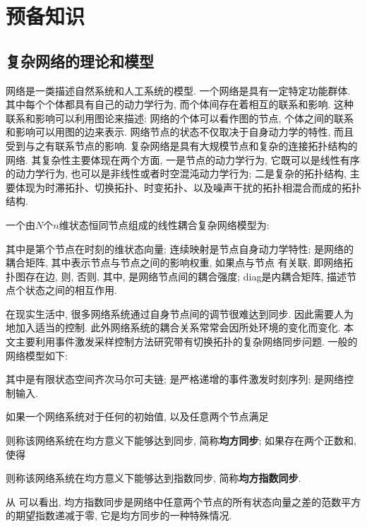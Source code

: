 \chapter{预备知识}\label{chap:math}
\section{复杂网络的理论和模型}
        网络是一类描述自然系统和人工系统的模型. 一个网络是具有一定特定功能群体. 其中每个个体都具有自己的动力学行为, 而个体间存在着相互的联系和影响. 这种联系和影响可以利用图论来描述: 网络的个体可以看作图的节点, 个体之间的联系和影响可以用图的边来表示. 网络节点的状态不仅取决于自身动力学的特性, 而且受到与之有联系节点的影响.
        复杂网络是具有大规模节点和复杂的连接拓扑结构的网络. 其复杂性主要体现在两个方面, 一是节点的动力学行为, 它既可以是线性有序的动力学行为, 也可以是非线性或者时空混沌动力学行为; 二是复杂的拓扑结构, 主要体现为时滞拓扑、切换拓扑、时变拓扑、以及噪声干扰的拓扑相混合而成的拓扑结构.

        一个由$N$个$n$维状态恒同节点组成的线性耦合复杂网络模型为:
        \begin{comment}
           \dot{x}_{i}(t)=f(t,x_{i}(t))-c\sum^N_{j=1}l_{ij}\Gamma[x_{j}(t)-x_{i}(t)], \quad i = 1,\cdots,N,
        \end{comment}
        其中是第个节点在时刻的维状态向量; 连续映射是节点自身动力学特性; 是网络的耦合矩阵, 其中表示节点与节点之间的影响权重, 如果点与节点 有关联, 即网络拓扑图存在边, 则, 否则, 其中,  是网络节点间的耦合强度; diag是内耦合矩阵, 描述节点个状态之间的相互作用.

        在现实生活中, 很多网络系统通过自身节点间的调节很难达到同步. 因此需要人为地加入适当的控制. 此外网络系统的耦合关系常常会因所处环境的变化而变化. 本文主要利用事件激发采样控制方法研究带有切换拓扑的复杂网络同步问题. 一般的网络模型如下:
        \begin{comment}\label{eventcontrolnetwork}
           \nonumber \dot{x}_{i}(t)&=f(t,x_{i}(t))-c\sum^N_{j=1}l_{ij}(r_{t})\Gamma[x_{j}(t_k)-x_{i}(t_{k})]+u_i(t),\\
            &\quad\quad t_{k}\leq t< t_{k+1}, \quad i = 1,\cdots,N,
        \end{comment}
        其中是有限状态空间齐次马尔可夫链; 是严格递增的事件激发时刻序列; 是网络控制输入.
        \begin{defn}\label{defn1}%
            如果一个网络系统对于任何的初始值, 以及任意两个节点满足\

            则称该网络系统在均方意义下能够达到同步, 简称\textbf{均方同步};
            如果存在两个正数和, 使得

            则称该网络系统在均方意义下能够达到指数同步, 简称\textbf{均方指数同步}.
        \end{defn}
    \begin{rem}
    从 可以看出, 均方指数同步是网络中任意两个节点的所有状态向量之差的范数平方的期望指数递减于零, 它是均方同步的一种特殊情况.
    \end{rem}
